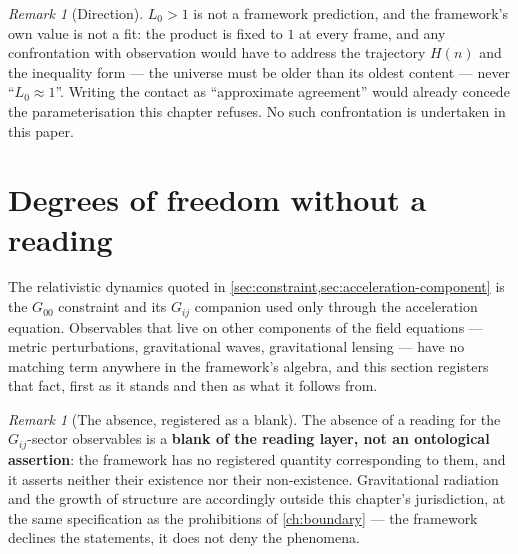 \documentclass[11pt]{amsbook}
\theoremstyle{plain}
\theoremstyle{definition}
\theoremstyle{remark}
\newtheorem{remark}[theorem]{Remark}
\begin{document}
\begin{remark}[Direction]\label{rem:l0-direction}
$L_{0} > 1$ is not a framework prediction, and the framework's own value is not a fit: the product is fixed to $1$ at every frame, and any confrontation with observation would have to address the trajectory $H(n)$ and the inequality form --- the universe must be older than its oldest content --- never ``$L_{0} \approx 1$''. Writing the contact as ``approximate agreement'' would already concede the parameterisation this chapter refuses. No such confrontation is undertaken in this paper.
\end{remark}

\section{Degrees of freedom without a reading}\label{sec:no-dof}

The relativistic dynamics quoted in \cref{sec:constraint,sec:acceleration-component} is the $G_{00}$ constraint and its $G_{ij}$ companion used only through the acceleration equation. Observables that live on other components of the field equations --- metric perturbations, gravitational waves, gravitational lensing --- have no matching term anywhere in the framework's algebra, and this section registers that fact, first as it stands and then as what it follows from.

\begin{remark}[The absence, registered as a blank]\label{rem:blank}
The absence of a reading for the $G_{ij}$-sector observables is a \textbf{blank of the reading layer, not an ontological assertion}: the framework has no registered quantity corresponding to them, and it asserts neither their existence nor their non-existence. Gravitational radiation and the growth of structure are accordingly outside this chapter's jurisdiction, at the same specification as the prohibitions of \cref{ch:boundary} --- the framework declines the statements, it does not deny the phenomena.
\end{remark}
\end{document}
